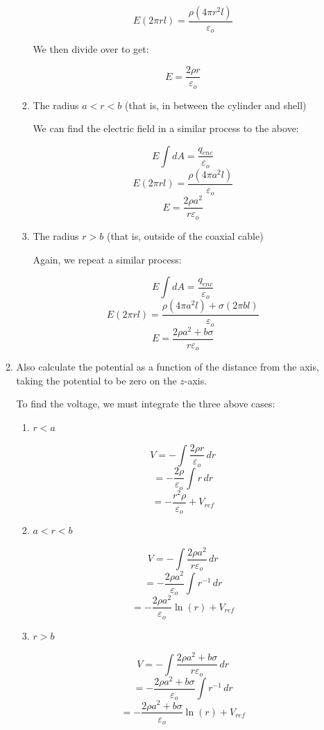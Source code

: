 \begin{enumerate}
\begin{enumerate}
\begin{enumerate}
            $$E(2\pi rl)=\frac{\rho(4\pi r^2l)}{\varepsilon_o}$$

            We then divide over to get:

            $$E=\frac{2\rho r}{\varepsilon_o}$$

          \item The radius $a<r<b$ (that is, in between the cylinder and shell)

            We can find the electric field in a similar process to the above:

            $$E\int dA=\frac{q_{enc}}{\varepsilon_o}$$
            $$E(2\pi rl)=\frac{\rho(4\pi a^2 l)}{\varepsilon_o}$$
            $$E=\frac{2\rho a^2}{r\varepsilon_o}$$

          \item The radius $r>b$ (that is, outside of the coaxial cable)

            Again, we repeat a similar process:

            $$E\int dA=\frac{q_{enc}}{\varepsilon_o}$$
            $$E(2\pi rl)=\frac{\rho(4\pi a^2l)+\sigma(2\pi bl)}{\varepsilon_o}$$
            $$E=\frac{2\rho a^2+b\sigma}{r\varepsilon_o}$$

        \end{enumerate}

      \item Also calculate the potential as a function of the distance from the axis, taking the potential to be zero on the $z$-axis.

        To find the voltage, we must integrate the three above cases:

        \begin{enumerate}

          \item $r<a$

            $$V=-\int \frac{2\rho r}{\varepsilon_o}\,dr$$
            $$=-\frac{2\rho}{\varepsilon_o}\int r\,dr$$
            $$=-\frac{r^2\rho}{\varepsilon_o}+V_{ref}$$

          \item $a<r<b$

            $$V=-\int \frac{2\rho a^2}{r\varepsilon_o}\,dr$$
            $$=-\frac{2\rho a^2}{\varepsilon_o}\int r^{-1}\,dr$$
            $$=-\frac{2\rho a^2}{\varepsilon_o}\ln(r)+V_{ref}$$

          \item $r>b$

            $$V=-\int \frac{2\rho a^2+b\sigma}{r\varepsilon_o}\,dr$$
            $$=-\frac{2\rho a^2+b\sigma}{\varepsilon_o}\int r^{-1}\,dr$$
            $$=-\frac{2\rho a^2+b\sigma}{\varepsilon_o}\ln(r)+V_{ref}$$


\end{enumerate}
\end{enumerate}
\end{enumerate}

